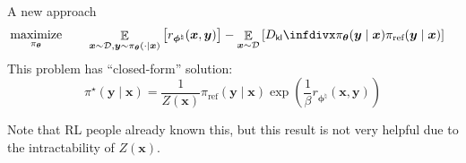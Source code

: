 \documentclass[10pt,xcolor={usenames,dvipsnames,table},aspectratio=169]{beamer}
\begin{document}
%


\begin{frame}{A new approach}
\begin{alignat}{2}
    & \maximize_{\pi_{\boldsymbol \theta}} \quad && \mathop{\mathbb{E}}_{\bm{x} \sim \mathcal{D}, {\bm{y} \sim \pi_{\boldsymbol \theta}(\cdot \mid \bm{x})}} \left[  {r_{\boldsymbol \phi^{\natural}}(\bm{x}, \bm{y})} \right] 
    - \mathop{\mathbb{E}}_{\bm{x} \sim \mathcal{D}} \left[  \Dkl{\pi_{\boldsymbol \theta}(\bm{y} \mid \bm{x})}{\pi_{\text{ref}}(\bm{y} \mid \bm{x})}\right]
\end{alignat}
This problem has ``closed-form'' solution:
\[
\pi^{\star }(\bm{y} \mid \bm{x}) = \dfrac{1}{Z(\bm{x})} \pi_{\text{ref}}(\bm{y} \mid \bm{x}) \exp \left( \dfrac{1}{\beta} r_{\boldsymbol \phi^{\natural}}(\bm{x}, \bm{y}) \right)
\] 

Note that RL people already known this, but this result is not very helpful due to the intractability of $Z(\bm{x})$.
\end{frame}
\end{document}
